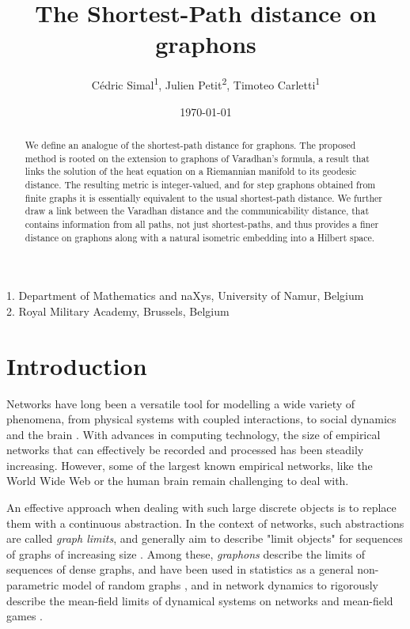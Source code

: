 \documentclass[11pt]{article}
\date{\today}
\title{The Shortest-Path distance on graphons}
\author{
\small
Cédric Simal\textsuperscript{1},
Julien Petit\textsuperscript{2},
Timoteo Carletti\textsuperscript{1}
}
\theoremstyle{definition}
\begin{document}
\maketitle
{
\small
1. Department of Mathematics and naXys, University of Namur, Belgium\\
2. Royal Military Academy, Brussels, Belgium
}

\begin{abstract}
    We define an analogue of the shortest-path distance for graphons. The proposed method is rooted on the extension to graphons of Varadhan's formula, a result that links the solution of the heat equation on a Riemannian manifold to its geodesic distance. The resulting metric is integer-valued, and for step graphons obtained from finite graphs it is essentially equivalent to the usual shortest-path distance. We further draw a link between the Varadhan distance and the communicability distance, that contains information from all paths, not just shortest-paths, and thus provides a finer distance on graphons along with a natural isometric embedding into a Hilbert space.
\end{abstract}


\section{Introduction}

Networks have long been a versatile tool for modelling a wide variety of phenomena, from physical systems with coupled interactions, to social dynamics and the brain \cite{BarabasiNetworkScience2016,NewmanNetworks2018}. With advances in computing technology, the size of empirical networks that can effectively be recorded and processed has been steadily increasing. However, some of the largest known empirical networks, like the World Wide Web or the human brain remain challenging to deal with. 

An effective approach when dealing with such large discrete objects is to replace them with a continuous abstraction. In the context of networks, such abstractions are called \textit{graph limits}, and generally aim to describe "limit objects" for sequences of graphs of increasing size \cite{lovaszLimitsDenseGraph2006b,benjaminiRecurrenceDistributionalLimits2001,backhauszActionConvergenceOperators2022,borgsLimitsSparseConfiguration2021,borgsLpTheorySparse2019,budelRandomHyperbolicGraphs2024a}. Among these, \textit{graphons} \cite{lovaszGraphon2012} describe the limits of sequences of dense graphs, and have been used in statistics as a general non-parametric model of random graphs \cite{diaconisGraphLimitsExchangeable2008,borgsGraphonsNonparametricMethod2017a}, and in network dynamics to rigorously describe the mean-field limits of dynamical systems on networks \cite{Medvedev2013TheNH,Petit2019RandomWO,vizueteGraphonBasedSensitivityAnalysis2020,bramburgerPatternFormationRandom2023,nagpalSynchronizationRandomNetworks2024} and mean-field games \cite{Parise2018GraphonGA,cainesGraphonMeanField2021a}.
\end{document}
